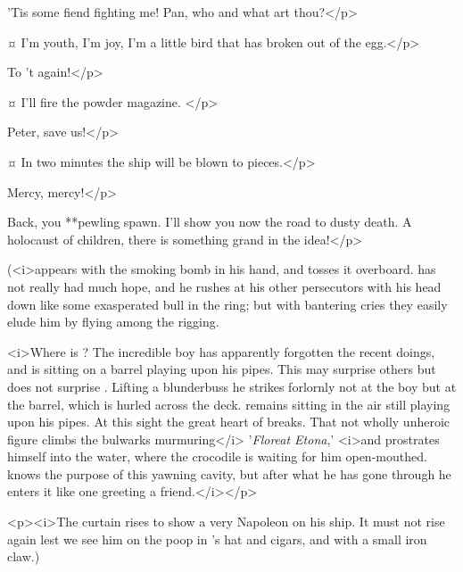 \begin{drama}
\hookspeaks
'Tis some fiend fighting me!
Pan, who and what art thou?</p>


\peterspeaks {}¤
I'm youth, I'm joy, I'm a little bird that has broken out of the egg.</p>

\hookspeaks
To 't again!</p>


\hookspeaks {}¤
I'll fire the powder magazine.
</p>

Peter, save us!</p>


\hookspeaks {}¤
In two minutes the ship will be blown to pieces.</p>


Mercy, mercy!</p>

\hookspeaks
Back, you **pewling spawn.
I'll show you now the road to dusty death.
A holocaust of children, there is something grand in the idea!</p>

\begin{stagedir}
(\peter <i>appears with the smoking bomb in his hand, and tosses it overboard.
\hook has not really had much hope,
and he rushes at his other persecutors with his head down like some exasperated bull in the ring;
but with bantering cries they easily elude him by flying among the rigging.

<i>Where is \peter?
The incredible boy has apparently forgotten the recent doings, and is sitting on a barrel playing upon his pipes.
This may surprise others but does not surprise \hook.
Lifting a blunderbuss he strikes forlornly not at the boy but at the barrel, which is hurled across the deck.
\peter remains sitting in the air still playing upon his pipes.
At this sight the great heart of \hook breaks.
That not wholly unheroic figure climbs the bulwarks murmuring</i> '\emph{Floreat Etona},'
<i>and prostrates himself into the water, where the crocodile is waiting for him open-mouthed.
\hook knows the purpose of this yawning cavity,
but after what he has gone through he enters it like one greeting a friend.</i></p>

<p><i>The curtain rises to show \peter a very Napoleon on his ship.
It must not rise again lest we see him on the poop in \hook's hat and cigars, and with a small iron claw.)
\end{stagedir}

\end{drama}

\endinput

